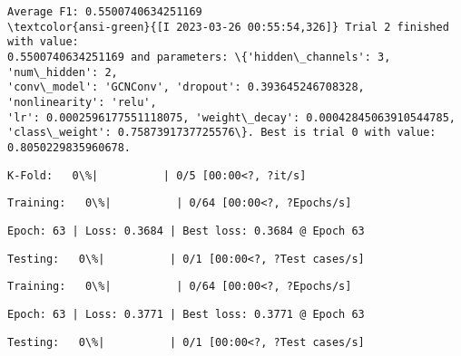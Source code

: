 \documentclass[11pt]{article}
\begin{document}
    
    \begin{Verbatim}[commandchars=\\\{\}]
Average F1: 0.5500740634251169
\textcolor{ansi-green}{[I 2023-03-26 00:55:54,326]} Trial 2 finished with value:
0.5500740634251169 and parameters: \{'hidden\_channels': 3, 'num\_hidden': 2,
'conv\_model': 'GCNConv', 'dropout': 0.393645246708328, 'nonlinearity': 'relu',
'lr': 0.0002596177551118075, 'weight\_decay': 0.00042845063910544785,
'class\_weight': 0.7587391737725576\}. Best is trial 0 with value:
0.8050229835960678.
    \end{Verbatim}

    
    \begin{Verbatim}[commandchars=\\\{\}]
K-Fold:   0\%|          | 0/5 [00:00<?, ?it/s]
    \end{Verbatim}

    
    
    \begin{Verbatim}[commandchars=\\\{\}]
Training:   0\%|          | 0/64 [00:00<?, ?Epochs/s]
    \end{Verbatim}

    
    \begin{Verbatim}[commandchars=\\\{\}]
Epoch: 63 | Loss: 0.3684 | Best loss: 0.3684 @ Epoch 63
    \end{Verbatim}

    
    \begin{Verbatim}[commandchars=\\\{\}]
Testing:   0\%|          | 0/1 [00:00<?, ?Test cases/s]
    \end{Verbatim}

    
    
    \begin{Verbatim}[commandchars=\\\{\}]
Training:   0\%|          | 0/64 [00:00<?, ?Epochs/s]
    \end{Verbatim}

    
    \begin{Verbatim}[commandchars=\\\{\}]
Epoch: 63 | Loss: 0.3771 | Best loss: 0.3771 @ Epoch 63
    \end{Verbatim}

    
    \begin{Verbatim}[commandchars=\\\{\}]
Testing:   0\%|          | 0/1 [00:00<?, ?Test cases/s]
    \end{Verbatim}
\end{document}
